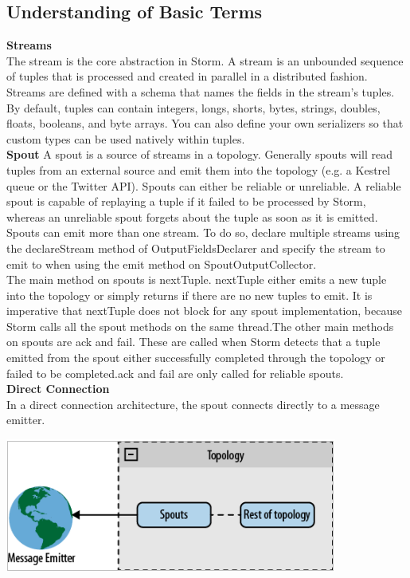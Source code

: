 \subsection{Understanding of Basic Terms}
{\bfseries Streams}\\[2mm]
The stream is the core abstraction in Storm. A stream is an unbounded sequence of tuples that is processed and created in parallel in a distributed fashion. Streams are defined with a schema that names the fields in the stream's tuples. By default, tuples can contain integers, longs, shorts, bytes, strings, doubles, floats, booleans, and byte arrays. You can also define your own serializers so that custom types can be used natively within tuples.\\[2mm]
{\bfseries Spout}
A spout is a source of streams in a topology. Generally spouts will read tuples from an external source and emit them into the topology (e.g. a Kestrel queue or the Twitter API). Spouts can either be reliable or unreliable. A reliable spout is capable of replaying a tuple if it failed to be processed by Storm, whereas an unreliable spout forgets about the tuple as soon as it is emitted.\\[1mm]
Spouts can emit more than one stream. To do so, declare multiple streams using the declareStream method of OutputFieldsDeclarer and specify the stream to emit to when using the emit method on SpoutOutputCollector.\\[1mm]
The main method on spouts is nextTuple. nextTuple either emits a new tuple into the topology or simply returns if there are no new tuples to emit. It is imperative that nextTuple does not block for any spout implementation, because Storm calls all the spout methods on the same thread.The other main methods on spouts are ack and fail. These are called when Storm detects that a tuple emitted from the spout either successfully completed through the topology or failed to be completed.ack and fail are only called for reliable spouts.\\[2mm]
{\bfseries Direct Connection}\\[2mm]
In a direct connection architecture, the spout connects directly to a message emitter.
\begin{center}
\includegraphics[scale=.5]{../img/img3} \\[2mm]
\end{center}
